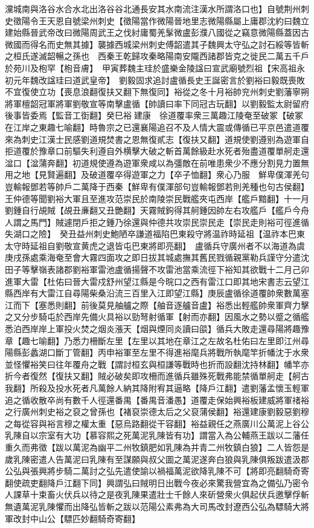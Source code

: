 灙城南與洛谷水合水北出洛谷谷北通長安其水南流注漢水所謂洛口也】自號荆州刺史徵陽令王天恩自號梁州刺史【徵陽當作微陽晉地里志微陽縣屬上庸郡沈約曰魏立建始縣晉武帝改曰微陽周武王之伐紂庸蜀羌髳微盧彭濮八國從之竊意微陽縣蓋因古微國而得名而史無其據】襲據西城梁州刺史傅韶遣其子魏興太守弘之討石綏等皆斬之桓氏遂滅韶暢之孫也　西秦王乾歸攻秦略陽南安隴西諸郡皆克之徙民二萬五千戶於苑川及枹罕【枹音膚】　甲寅葬魏主珪於盛樂金陵諡曰宣武廟號烈祖【宋高祖永初元年魏改諡珪曰道武皇帝】　劉毅固求追討盧循長史王誕密言於劉裕曰毅既喪敗不宜復使立功【喪息浪翻復扶又翻下無復同】裕從之冬十月裕帥兖州刺史劉藩寧朔將軍檀韶冠軍將軍劉敬宣等南擊盧循【帥讀曰率下同冠古玩翻】以劉毅監太尉留府後事皆委焉【監音工衘翻】癸巳裕建康　徐道覆率衆三萬趣江陵奄至破冢【破冢在江岸之東趣七喻翻】時魯宗之已還襄陽追召不及人情大震或傳循已平京邑遣道覆來為刺史江漢士民感劉道規焚書之恩無復貳志【復扶又翻】道規使劉遵别為遊軍自拒道覆於豫章口前驅失利遵自外横擊大破之斬首萬餘級赴水死者殆盡道覆單舸走還湓口【湓蒲奔翻】初道規使遵為遊軍衆咸以為彊敵在前唯患衆少不應分割見力置無用之地【見賢遍翻】及破道覆卒得遊軍之力【卒子恤翻】衆心乃服　鮮卑僕渾羌句豈輸報鄧若等帥戶二萬降于西秦【鮮卑有僕渾部句豈輸報鄧若則羌種也句古侯翻】　王仲德等聞劉裕大軍且至進攻范崇民於南陵崇民戰艦夾屯西岸【艦戶黯翻】十一月劉鍾自行覘賊【覘丑亷翻又丑艷翻】天霧賊鉤得其舸鍾因帥左右攻艦戶【艦戶今舟人謂之馬門】賊遽閉戶拒之鍾乃徐還與仲德共攻崇民崇民走【崇民走則裕可徑進循失湖口之險】　癸丑益州刺史鮑陋卒謙道福陷巴東殺守將温祚時延祖【温祚本巴東太守時延祖自劉敬宣黄虎之退皆屯巴東將即亮翻】　盧循兵守廣州者不以海道為虞庚戌孫處乘海奄至會大霧四面攻之即日拔其城處撫其舊民戮循親黨勒兵謹守分遣沈田子等擊嶺表諸郡劉裕軍雷池盧循揚聲不攻雷池當乘流徑下裕知其欲戰十二月己卯進軍大雷【杜佑曰晉大雷戍舒州望江縣是今晥口之西有雷江口即其地宋書志云望江縣西岸有大雷江自尋陽柴桑沿流三百里入江即望江縣】庚辰盧循徐道覆帥衆數萬塞江而下【塞悉則翻】前後莫見舳艫之際【舳音逐艫音盧】裕悉出輕艦帥衆軍齊力擊之又分步騎屯於西岸先備火具裕以勁弩射循軍【射而亦翻】因風水之勢以蹙之循艦悉泊西岸岸上軍投火焚之烟炎漲天【烟與煙同炎讀曰燄】循兵大敗走還尋陽將趣豫章【趣七喻翻】乃悉力柵斷左里【左里以其地在章江之左故名杜佑曰左里即江州尋陽縣彭蠡湖口斷丁管翻】丙申裕軍至左里不得進裕麾兵將戰所執麾竿折幡沈于水衆並怪懼裕笑曰往年覆舟之戰【謂討桓玄與桓謙等戰時也折而設翻沈持林翻】幡竿亦折今者復然【復扶又翻】賊必破矣即攻柵而進循兵雖殊死戰弗能禁循單舸走【舸古我翻】所殺及投水死者凡萬餘人納其降附宥其逼略【降戶江翻】遣劉藩孟懷玉輕軍追之循收散卒尚有數千人徑還番禺【番禺音潘愚】道覆走保始興裕板建威將軍禇裕之行廣州刺史裕之裒之曾孫也【褚裒崇德太后之父裒蒲侯翻】裕還建康劉毅惡劉穆之每從容與裕言穆之權太重【惡烏路翻從干容翻】裕益親任之燕廣川公萬泥上谷公乳陳自以宗室有大功【慕容熙之死萬泥乳陳皆有功】謂當入為公輔燕王跋以二藩任重久而弗徵【跋以萬泥為幽平二州牧鎮肥如乳陳為并青二州牧鎮白狼】二人皆怨是歲乳陳密遣人告萬泥曰乳陳有至謀願與叔父圖之萬泥遂奔白狼與乳陳俱叛跋遣汲郡公弘與張興將步騎二萬討之弘先遣使諭以禍福萬泥欲降乳陳不可【將即亮翻騎奇寄翻使疏吏翻降戶江翻下同】興謂弘曰賊明日出戰今夜必來驚我營宜為之備弘乃密令人課草十束畜火伏兵以待之是夜乳陳果遣壯士千餘人來斫營衆火俱起伏兵邀擊俘斬無遺萬泥乳陳懼而出降弘皆斬之跋以范陽公素弗為大司馬改封遼西公弘為驃騎大將軍改封中山公【驃匹妙翻騎奇寄翻】

